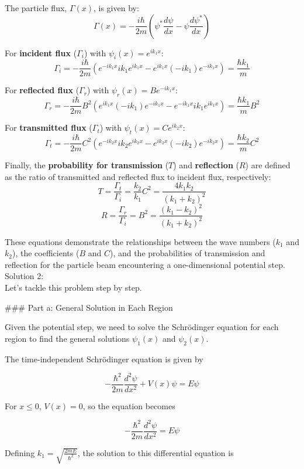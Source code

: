 \documentclass[a4paper,11pt]{article}
\begin{document}
The particle flux, \(\Gamma(x)\), is given by:
\[ \Gamma(x) = -\frac{i\hbar}{2m} \left(\psi^{*}\frac{d\psi}{dx} - \psi\frac{d\psi^{*}}{dx} \right) \]

For \textbf{incident flux} (\(\Gamma_i\)) with \(\psi_i(x) = e^{ik_1x}\):
\[ \Gamma_i = -\frac{i\hbar}{2m} \left(e^{-ik_1x}ik_1e^{ik_1x} - e^{ik_1x}(-ik_1)e^{-ik_1x} \right) = \frac{\hbar k_1}{m} \]

For \textbf{reflected flux} (\(\Gamma_r\)) with \(\psi_r(x) = Be^{-ik_1x}\):
\[ \Gamma_r = -\frac{i\hbar}{2m} B^2 \left(e^{ik_1x}(-ik_1)e^{-ik_1x} - e^{-ik_1x}ik_1e^{ik_1x} \right) = \frac{\hbar k_1}{m}B^2 \]

For \textbf{transmitted flux} (\(\Gamma_t\)) with \(\psi_t(x) = Ce^{ik_2x}\):
\[ \Gamma_t = -\frac{i\hbar}{2m} C^2 \left(e^{-ik_2x}ik_2e^{ik_2x} - e^{ik_2x}(-ik_2)e^{-ik_2x} \right) = \frac{\hbar k_2}{m}C^2 \]

Finally, the \textbf{probability for transmission} (\(T\)) and \textbf{reflection} (\(R\)) are defined as the ratio of transmitted and reflected flux to incident flux, respectively:
\[ T = \frac{\Gamma_t}{\Gamma_i} = \frac{k_2}{k_1}C^2 = \frac{4k_1k_2}{(k_1 + k_2)^2} \]
\[ R = \frac{\Gamma_r}{\Gamma_i} = B^2 = \frac{(k_1 - k_2)^2}{(k_1 + k_2)^2} \]

These equations demonstrate the relationships between the wave numbers (\(k_1\) and \(k_2\)), the coefficients (\(B\) and \(C\)), and the probabilities of transmission and reflection for the particle beam encountering a one-dimensional potential step. \\ 

\noindent Solution 2: \\

Let's tackle this problem step by step.

### Part a: General Solution in Each Region

Given the potential step, we need to solve the Schrödinger equation for each region to find the general solutions \(\psi_1(x)\) and \(\psi_2(x)\).

The time-independent Schrödinger equation is given by

\[
-\frac{\hbar^2}{2m} \frac{d^2\psi}{dx^2} + V(x)\psi = E\psi
\]

For \(x \leq 0\), \(V(x) = 0\), so the equation becomes

\[
-\frac{\hbar^2}{2m} \frac{d^2\psi}{dx^2} = E\psi
\]

Defining \(k_1 = \sqrt{\frac{2mE}{\hbar^2}}\), the solution to this differential equation is
\end{document}
